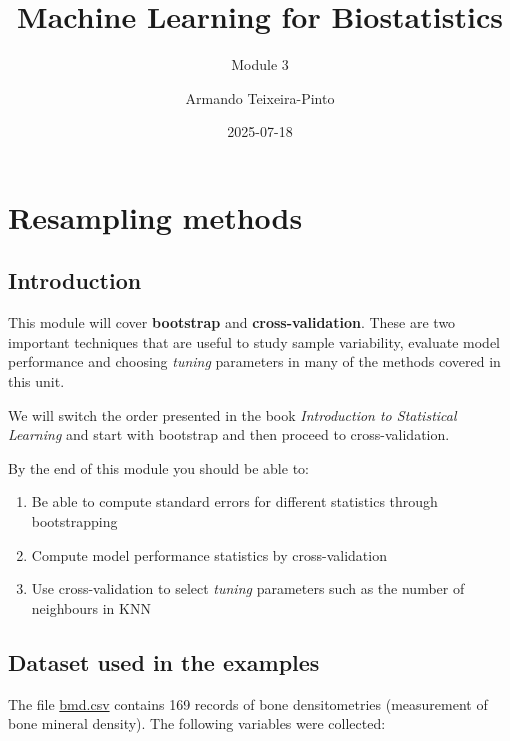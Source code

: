\documentclass[
]{book}
\title{Machine Learning for Biostatistics}
\subtitle{Module 3}
\author{Armando Teixeira-Pinto}
\date{2025-07-18}
\providecommand{\tightlist}{%
  \setlength{\itemsep}{0pt}\setlength{\parskip}{0pt}}
\begin{document}
\maketitle

{
\setcounter{tocdepth}{1}
\tableofcontents
}
\chapter*{Resampling methods}\label{resampling-methods}

\section*{Introduction}\label{introduction}

This module will cover \textbf{bootstrap} and \textbf{cross-validation}. These are two
important techniques that are useful to study sample variability, evaluate
model performance and choosing \emph{tuning} parameters in many of the methods
covered in this unit.

We will switch the order presented in the book \emph{Introduction to Statistical
Learning} and start with bootstrap and then proceed to cross-validation.

By the end of this module you should be able to:

\begin{enumerate}
\def\labelenumi{\arabic{enumi}.}
\tightlist
\item
  Be able to compute standard errors for different statistics
  through bootstrapping
\item
  Compute model performance statistics by cross-validation
\item
  Use cross-validation to select \emph{tuning} parameters such
  as the number of neighbours in KNN
\end{enumerate}

\section*{Dataset used in the examples}\label{dataset-used-in-the-examples}

The file \href{https://www.dropbox.com/s/7wjsfdaf0wt2kg2/bmd.csv?dl=1}{bmd.csv}
contains 169 records of bone densitometries (measurement of
bone mineral density). The following variables were collected:
\end{document}
